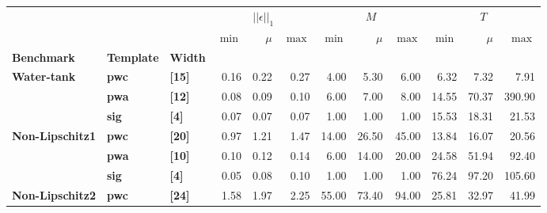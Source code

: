 \begin{tabular}{lllrrrrrrrrr}
    \toprule
                            &                   &                  & \multicolumn{3}{c}{$||\epsilon||_1$} & \multicolumn{3}{c}{$M$} & \multicolumn{3}{c}{$T$}                                                       \\
                            &                   &                  & $\min$                               & $\mu$                   & $\max$                  & $\min$ & $\mu$ & $\max$ & $\min$ & $\mu$  & $\max$  \\
    \textbf{Benchmark}      & \textbf{Template} & \textbf{Width}   &                                      &                         &                         &        &       &        &        &        &         \\
    \midrule
    \textbf{Water-tank}     & \textbf{pwc}      & \textbf{[15]}    & 0.16                                 & 0.22                    & 0.27                    & 4.00   & 5.30  & 6.00   & 6.32   & 7.32   & 7.91    \\
                            & \textbf{pwa}      & \textbf{[12]}    & 0.08                                 & 0.09                    & 0.10                    & 6.00   & 7.00  & 8.00   & 14.55  & 70.37  & 390.90  \\
                            & \textbf{sig}      & \textbf{[4]}     & 0.07                                 & 0.07                    & 0.07                    & 1.00   & 1.00  & 1.00   & 15.53  & 18.31  & 21.53   \\
    \textbf{Non-Lipschitz1} & \textbf{pwc}      & \textbf{[20]}    & 0.97                                 & 1.21                    & 1.47                    & 14.00  & 26.50 & 45.00  & 13.84  & 16.07  & 20.56   \\
                            & \textbf{pwa}      & \textbf{[10]}    & 0.10                                 & 0.12                    & 0.14                    & 6.00   & 14.00 & 20.00  & 24.58  & 51.94  & 92.40   \\
                            & \textbf{sig}      & \textbf{[4]}     & 0.05                                 & 0.08                    & 0.10                    & 1.00   & 1.00  & 1.00   & 76.24  & 97.20  & 105.60  \\
    \textbf{Non-Lipschitz2} & \textbf{pwc}      & \textbf{[24]}    & 1.58                                 & 1.97                    & 2.25                    & 55.00  & 73.40 & 94.00  & 25.81  & 32.97  & 41.99   \\

\end{tabular}
